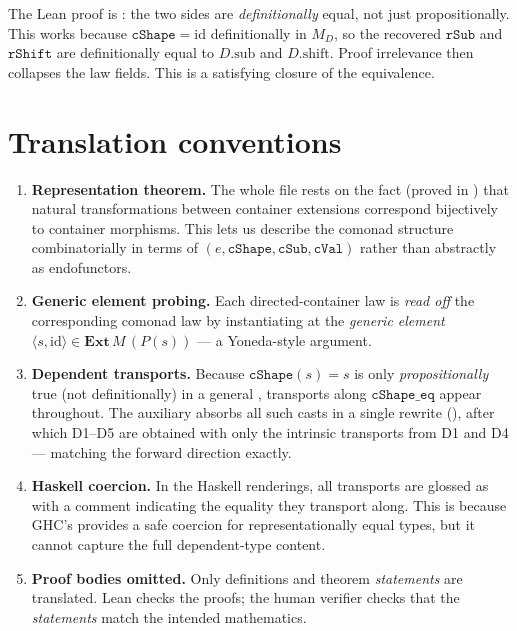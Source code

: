 \documentclass[11pt,a4paper]{article}
\begin{document}
\begin{fidelitynote}
The Lean proof is : the two sides are \emph{definitionally} equal,
not just propositionally.  This works because $\mathtt{cShape} = \mathrm{id}$
definitionally in $M_D$, so the recovered $\mathtt{rSub}$ and $\mathtt{rShift}$
are definitionally equal to $D.\mathrm{sub}$ and $D.\mathrm{shift}$.  Proof
irrelevance then collapses the law fields.  This is a satisfying closure of the
equivalence.
\end{fidelitynote}


\section{Translation conventions}

\begin{enumerate}
\item \textbf{Representation theorem.}  The whole file rests on the fact
  (proved in ) that natural transformations between
  container extensions correspond bijectively to container morphisms.  This
  lets us describe the comonad structure combinatorially in terms of
  $(e, \mathtt{cShape}, \mathtt{cSub}, \mathtt{cVal})$ rather than abstractly
  as endofunctors.

\item \textbf{Generic element probing.}  Each directed-container law is
  \emph{read off} the corresponding comonad law by instantiating at the
  \emph{generic element} $\langle s, \mathrm{id}\rangle \in \mathbf{Ext}\,M\,(P(s))$
  --- a Yoneda-style argument.

\item \textbf{Dependent transports.}  Because $\mathtt{cShape}(s) = s$ is only
  \emph{propositionally} true (not definitionally) in a general
  , transports along $\mathtt{cShape\_eq}$ appear
  throughout.  The auxiliary  absorbs all such casts in a
  single rewrite (), after which D1--D5 are obtained with
  only the intrinsic transports from D1 and D4 --- matching the forward
  direction exactly.

\item \textbf{Haskell coercion.}  In the Haskell renderings, all transports
  are glossed as  with a comment indicating the equality they
  transport along.  This is because GHC's  provides a
  safe coercion for representationally equal types, but it cannot capture
  the full dependent-type content.

\item \textbf{Proof bodies omitted.}  Only definitions and theorem
  \emph{statements} are translated.  Lean checks the proofs; the human
  verifier checks that the \emph{statements} match the intended mathematics.
\end{enumerate}
\end{document}
